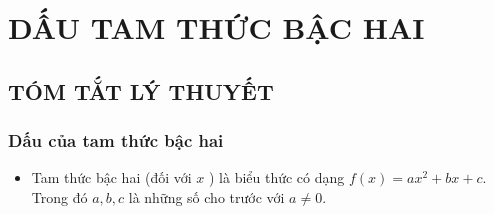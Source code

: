 \section{DẤU TAM THỨC BẬC HAI}
\subsection{TÓM TẮT LÝ THUYẾT}
\subsubsection{Dấu của tam thức bậc hai}
\begin{itemize}
	\item [\iconMT]   Tam thức bậc hai (đối với $x$ ) là biểu thức có dạng $f(x)=ax^2+bx+c$. Trong đó $a, b, c$ là những số cho trước với $a\ne 0$.
	

\end{itemize}
